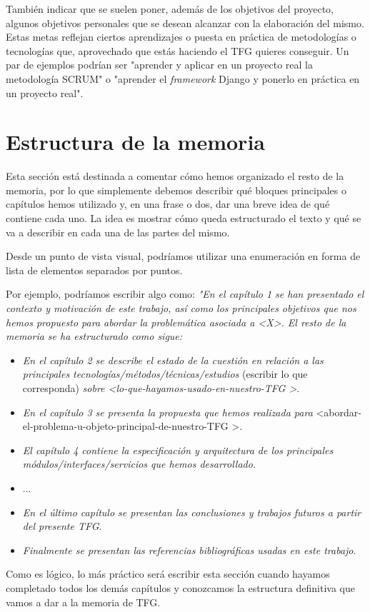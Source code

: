 También indicar que se suelen poner, además de los objetivos del proyecto, algunos objetivos personales que se desean alcanzar con la elaboración del mismo. Estas metas reflejan ciertos aprendizajes o puesta en práctica de metodologías o tecnologías que, aprovechado que estás haciendo el TFG quieres conseguir. Un par de ejemplos podrían ser "aprender y aplicar en un proyecto real la metodología SCRUM" o "aprender el \textit{framework} Django y ponerlo en práctica en un proyecto real". 

\section{Estructura de la memoria}
Esta sección está destinada a comentar cómo hemos organizado el resto de la memoria, por lo que simplemente debemos describir qué bloques principales o capítulos hemos utilizado y, en una frase o dos, dar una breve idea de qué contiene cada uno. La idea es mostrar cómo queda estructurado el texto y qué se va a describir en cada una de las partes del mismo.

Desde un punto de vista visual, podríamos utilizar una enumeración en forma de lista de elementos separados por puntos.

Por ejemplo, podríamos escribir algo como: \textit{"En el capítulo 1 se han presentado el contexto y motivación de este trabajo, así como los principales objetivos que nos hemos propuesto para abordar la problemática asociada a \textless X\textgreater. El resto de la memoria se ha estructurado como sigue:}

\begin{itemize}
  \item \textit{En el capítulo 2 se describe el estado de la cuestión en relación a las principales tecnologías/métodos/técnicas/estudios} (escribir lo que corresponda)\textit{ sobre \textless lo-que-hayamos-usado-en-nuestro-TFG \textgreater}.
  \item \textit{En el capítulo 3 se presenta la propuesta que hemos realizada para} \textless abordar-el-problema-u-objeto-principal-de-nuestro-TFG \textgreater.
  \item \textit{El capítulo 4 contiene la especificación y arquitectura de los principales módulos/interfaces/servicios que hemos desarrollado}.
  \item ...
  \item \textit{En el último capítulo se presentan las conclusiones y trabajos futuros a partir del presente TFG}.
  \item \textit{Finalmente se presentan las referencias bibliográficas usadas en este trabajo}.
\end{itemize}

Como es lógico, lo más práctico será escribir esta sección cuando hayamos completado todos los demás capítulos y conozcamos la estructura definitiva que vamos a dar a la memoria de TFG.
